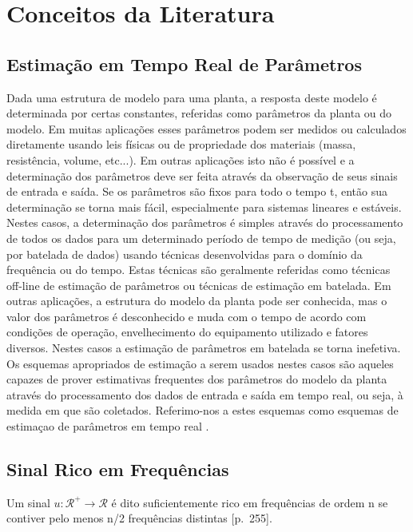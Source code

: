 \documentclass[
	12pt,				%
	openright,			%
	twoside,			%
	a4paper,			%
	english,			%
	french,				%
	spanish,			%
	brazil				%
	]{abntex2}
\begin{document}
\section{Conceitos da Literatura}

\subsection{Estimação em Tempo Real de Parâmetros}

 Dada uma estrutura de modelo para uma planta, a resposta deste modelo é determinada por certas constantes, referidas como parâmetros da planta ou do modelo. Em muitas aplicações esses parâmetros podem ser medidos ou calculados diretamente usando leis físicas ou de propriedade dos materiais (massa, resistência, volume, etc...). Em outras aplicações isto não é possível e a determinação dos parâmetros deve ser feita através da observação de seus sinais de entrada e saída. Se os parâmetros são fixos para todo o tempo t, então sua determinação se torna mais fácil, especialmente para sistemas lineares e estáveis. Nestes casos, a determinação dos parâmetros é simples através do processamento de todos os dados para um determinado período de tempo de medição (ou seja, por batelada de dados) usando técnicas desenvolvidas para o domínio da frequência ou do tempo. Estas técnicas são geralmente referidas como técnicas off-line de estimação de parâmetros ou técnicas de estimação em batelada. Em outras aplicações, a estrutura do modelo da planta pode ser conhecida, mas o valor dos parâmetros é desconhecido e muda com o tempo de acordo com condições de operação, envelhecimento do equipamento utilizado e fatores diversos. Nestes casos a estimação de parâmetros em batelada se torna inefetiva. \\

 Os esquemas apropriados de estimação a serem usados nestes casos são aqueles capazes de prover estimativas frequentes dos parâmetros do modelo da planta através do processamento dos dados de entrada e saída em tempo real, ou seja, à medida em que são coletados. Referimo-nos a estes esquemas como esquemas de estimaçao de parâmetros em tempo real \cite[p.~144-145]{ioannou2}.\\

\subsection{Sinal Rico em Frequências}

 Um sinal $u:\mathcal{R}^+\rightarrow \mathcal{R}$ é dito suficientemente rico em frequências de ordem n se contiver pelo menos n/2 frequências distintas [p.~255]\cite{ioannou2}.
 
\end{document}
